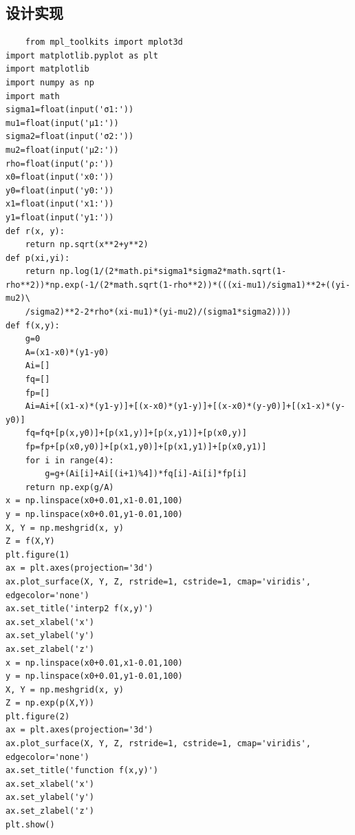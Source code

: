 \documentclass[UTF8,a4paper]{article}
\begin{document}
\subsection{设计实现}
\begin{lstlisting}
    from mpl_toolkits import mplot3d
import matplotlib.pyplot as plt
import matplotlib 
import numpy as np
import math 
sigma1=float(input('σ1:'))
mu1=float(input('μ1:'))
sigma2=float(input('σ2:'))
mu2=float(input('μ2:'))
rho=float(input('ρ:'))
x0=float(input('x0:'))
y0=float(input('y0:'))
x1=float(input('x1:'))
y1=float(input('y1:'))
def r(x, y):
    return np.sqrt(x**2+y**2)
def p(xi,yi):
    return np.log(1/(2*math.pi*sigma1*sigma2*math.sqrt(1-rho**2))*np.exp(-1/(2*math.sqrt(1-rho**2))*(((xi-mu1)/sigma1)**2+((yi-mu2)\
    /sigma2)**2-2*rho*(xi-mu1)*(yi-mu2)/(sigma1*sigma2))))
def f(x,y):
    g=0
    A=(x1-x0)*(y1-y0)
    Ai=[]
    fq=[]
    fp=[]
    Ai=Ai+[(x1-x)*(y1-y)]+[(x-x0)*(y1-y)]+[(x-x0)*(y-y0)]+[(x1-x)*(y-y0)]
    fq=fq+[p(x,y0)]+[p(x1,y)]+[p(x,y1)]+[p(x0,y)]
    fp=fp+[p(x0,y0)]+[p(x1,y0)]+[p(x1,y1)]+[p(x0,y1)]
    for i in range(4):
        g=g+(Ai[i]+Ai[(i+1)%4])*fq[i]-Ai[i]*fp[i]        
    return np.exp(g/A)
x = np.linspace(x0+0.01,x1-0.01,100)
y = np.linspace(x0+0.01,y1-0.01,100)
X, Y = np.meshgrid(x, y)
Z = f(X,Y)
plt.figure(1)
ax = plt.axes(projection='3d')
ax.plot_surface(X, Y, Z, rstride=1, cstride=1, cmap='viridis', edgecolor='none')
ax.set_title('interp2 f(x,y)')
ax.set_xlabel('x')
ax.set_ylabel('y')
ax.set_zlabel('z')
x = np.linspace(x0+0.01,x1-0.01,100)
y = np.linspace(x0+0.01,y1-0.01,100)
X, Y = np.meshgrid(x, y)
Z = np.exp(p(X,Y))
plt.figure(2)
ax = plt.axes(projection='3d')
ax.plot_surface(X, Y, Z, rstride=1, cstride=1, cmap='viridis', edgecolor='none')
ax.set_title('function f(x,y)')
ax.set_xlabel('x')
ax.set_ylabel('y')
ax.set_zlabel('z')
plt.show()
\end{lstlisting}
\end{document}
